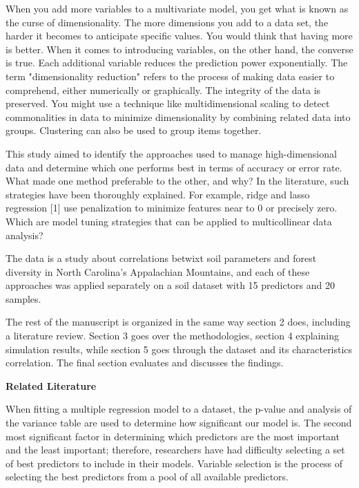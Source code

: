 \documentclass{article} %
\begin{document}
\noindent When you add more variables to a multivariate model, you get what is known as the curse of dimensionality. The more dimensions you add to a data set, the harder it becomes to anticipate specific values. You would think that having more is better. When it comes to introducing variables, on the other hand, the converse is true. Each additional variable reduces the prediction power exponentially. The term "dimensionality reduction" refers to the process of making data easier to comprehend, either numerically or graphically. The integrity of the data is preserved. You might use a technique like multidimensional scaling to detect commonalities in data to minimize dimensionality by combining related data into groups. Clustering can also be used to group items together. 

\noindent This study aimed to identify the approaches used to manage high-dimensional data and determine which one performs best in terms of accuracy or error rate. What made one method preferable to the other, and why? In the literature, such strategies have been thoroughly explained. For example, ridge and lasso regression [1] use penalization to minimize features near to 0 or precisely zero. Which are model tuning strategies that can be applied to multicollinear data analysis? 

\noindent The data is a study about correlations betwixt soil parameters and forest diversity in North Carolina's Appalachian Mountains, and each of these approaches was applied separately on a soil dataset with 15 predictors and 20 samples.

\noindent The rest of the manuscript is organized in the same way section 2 does, including a literature review. Section 3 goes over the methodologies, section 4 explaining simulation results, while section 5 goes through the dataset and its characteristics correlation. The final section evaluates and discusses the findings.

\noindent \textbf{Related Literature}

\noindent When fitting a multiple regression model to a dataset, the p-value and analysis of the variance table are used to determine how significant our model is. The second most significant factor in determining which predictors are the most important and the least important; therefore, researchers have had difficulty selecting a set of best predictors to include in their models. Variable selection is the process of selecting the best predictors from a pool of all available predictors.
\end{document}
